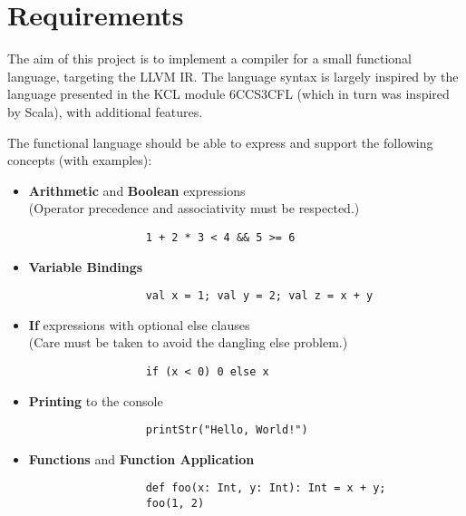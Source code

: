 \chapter{Requirements}
\label{sec:requirements}

The aim of this project is to implement a compiler for a small functional language, targeting the
LLVM IR. The language syntax is largely inspired by the language presented in the KCL module
6CCS3CFL (which in turn was inspired by Scala), with additional features.

The functional language should be able to express and support the following concepts (with
examples):

\begin{itemize}
      \item \textbf{Arithmetic} and \textbf{Boolean} expressions \\
            (Operator precedence and associativity must be respected.)
            \begin{verbatim}
                  1 + 2 * 3 < 4 && 5 >= 6
            \end{verbatim}

      \item \textbf{Variable Bindings}
            \begin{verbatim}
                  val x = 1; val y = 2; val z = x + y
            \end{verbatim}

      \item \textbf{If} expressions with optional else clauses \\
            (Care must be taken to avoid the dangling else problem.)
            \begin{verbatim}
                  if (x < 0) 0 else x
            \end{verbatim}

      \item \textbf{Printing} to the console
            \begin{verbatim}
                  printStr("Hello, World!")
            \end{verbatim}

      \item \textbf{Functions} and \textbf{Function Application}
            \begin{verbatim}
                  def foo(x: Int, y: Int): Int = x + y;
                  foo(1, 2)
            \end{verbatim}


\end{itemize}
